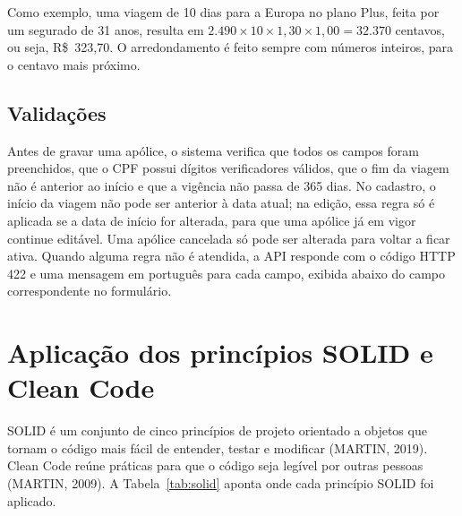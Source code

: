 \documentclass[12pt,a4paper]{article}
\begin{document}
Como exemplo, uma viagem de 10 dias para a Europa no plano Plus, feita por um segurado de 31
anos, resulta em $2.490 \times 10 \times 1{,}30 \times 1{,}00 = 32.370$ centavos, ou seja,
R\$~323,70. O arredondamento é feito sempre com números inteiros, para o centavo mais próximo.

\subsection{Validações}

Antes de gravar uma apólice, o sistema verifica que todos os campos foram preenchidos, que o CPF
possui dígitos verificadores válidos, que o fim da viagem não é anterior ao início e que a
vigência não passa de 365 dias. No cadastro, o início da viagem não pode ser anterior à data
atual; na edição, essa regra só é aplicada se a data de início for alterada, para que uma
apólice já em vigor continue editável. Uma apólice cancelada só pode ser alterada para voltar a
ficar ativa. Quando alguma regra não é atendida, a API responde com o código HTTP 422 e uma
mensagem em português para cada campo, exibida abaixo do campo correspondente no formulário.

\section{Aplicação dos princípios SOLID e Clean Code}\label{sec:solid}

SOLID é um conjunto de cinco princípios de projeto orientado a objetos que tornam o código mais
fácil de entender, testar e modificar (MARTIN, 2019). Clean Code reúne práticas para que o
código seja legível por outras pessoas (MARTIN, 2009). A Tabela~\ref{tab:solid} aponta onde
cada princípio SOLID foi aplicado.
\end{document}
